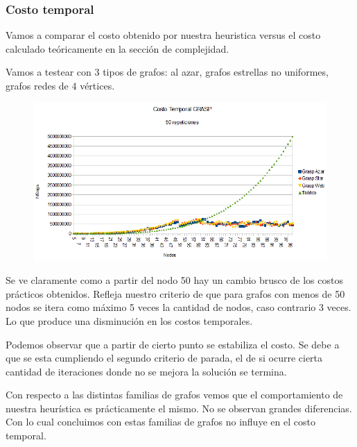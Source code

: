 \subsubsection{Costo temporal}

\quad Vamos a comparar el costo obtenido por nuestra heuristica versus el costo calculado teóricamente en la sección de complejidad.

\quad Vamos a testear con 3 tipos de grafos: al azar, grafos estrellas no uniformes, grafos redes de 4 vértices.

\begin{figure}[H]
	\centering
	\includegraphics[scale=0.6]{timingGRASP.png}
\end{figure}

\quad

\quad Se ve claramente como a partir del nodo 50 hay un cambio brusco de los costos prácticos obtenidos. Refleja nuestro criterio de que para grafos con menos de 50 nodos se itera como máximo 5 veces la cantidad de nodos, caso contrario 3 veces. Lo que produce una disminución en los costos temporales. 

\quad

\quad Podemos observar que a partir de cierto punto se estabiliza el costo. Se debe a que se esta cumpliendo el segundo criterio de parada, el de si ocurre cierta cantidad de iteraciones donde no se mejora la solución se termina. 

\quad

\quad Con respecto a las distintas familias de grafos vemos que el comportamiento de nuestra heurística es  prácticamente el mismo. No se observan grandes diferencias. Con lo cual concluimos con estas familias de grafos no influye en el costo temporal.